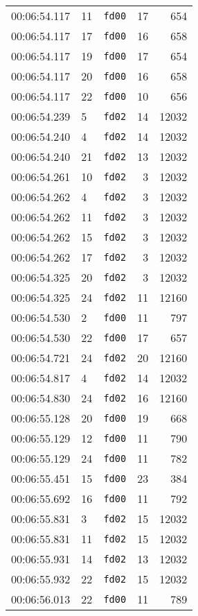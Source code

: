 \documentclass{article}
\begin{document}
\begin{longtable}{lllrr}
00:06:54.117 & 11 & \texttt{fd00} & 17 & 654 \\
00:06:54.117 & 17 & \texttt{fd00} & 16 & 658 \\
00:06:54.117 & 19 & \texttt{fd00} & 17 & 654 \\
00:06:54.117 & 20 & \texttt{fd00} & 16 & 658 \\
00:06:54.117 & 22 & \texttt{fd00} & 10 & 656 \\
00:06:54.239 & 5 & \texttt{fd02} & 14 & 12032 \\
00:06:54.240 & 4 & \texttt{fd02} & 14 & 12032 \\
00:06:54.240 & 21 & \texttt{fd02} & 13 & 12032 \\
00:06:54.261 & 10 & \texttt{fd02} & 3 & 12032 \\
00:06:54.262 & 4 & \texttt{fd02} & 3 & 12032 \\
00:06:54.262 & 11 & \texttt{fd02} & 3 & 12032 \\
00:06:54.262 & 15 & \texttt{fd02} & 3 & 12032 \\
00:06:54.262 & 17 & \texttt{fd02} & 3 & 12032 \\
00:06:54.325 & 20 & \texttt{fd02} & 3 & 12032 \\
00:06:54.325 & 24 & \texttt{fd02} & 11 & 12160 \\
00:06:54.530 & 2 & \texttt{fd00} & 11 & 797 \\
00:06:54.530 & 22 & \texttt{fd00} & 17 & 657 \\
00:06:54.721 & 24 & \texttt{fd02} & 20 & 12160 \\
00:06:54.817 & 4 & \texttt{fd02} & 14 & 12032 \\
00:06:54.830 & 24 & \texttt{fd02} & 16 & 12160 \\
00:06:55.128 & 20 & \texttt{fd00} & 19 & 668 \\
00:06:55.129 & 12 & \texttt{fd00} & 11 & 790 \\
00:06:55.129 & 24 & \texttt{fd00} & 11 & 782 \\
00:06:55.451 & 15 & \texttt{fd00} & 23 & 384 \\
00:06:55.692 & 16 & \texttt{fd00} & 11 & 792 \\
00:06:55.831 & 3 & \texttt{fd02} & 15 & 12032 \\
00:06:55.831 & 11 & \texttt{fd02} & 15 & 12032 \\
00:06:55.931 & 14 & \texttt{fd02} & 13 & 12032 \\
00:06:55.932 & 22 & \texttt{fd02} & 15 & 12032 \\
00:06:56.013 & 22 & \texttt{fd00} & 11 & 789 \\

\end{longtable}
\end{document}
